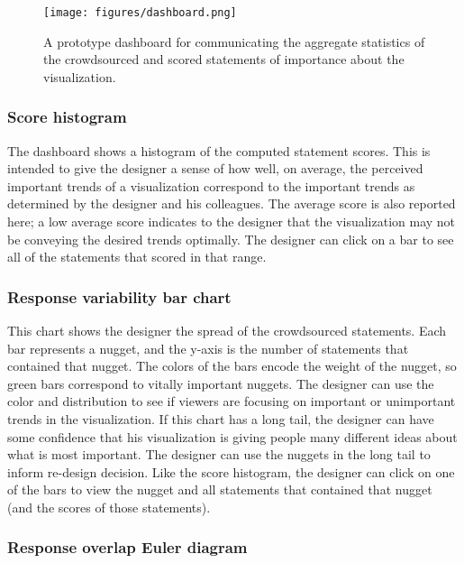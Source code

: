 \documentclass{sigchi}
\begin{document}
\begin{figure}[t]
  \begin{center}
    \texttt{[image: figures/dashboard.png]}
  \end{center}
  \caption{A prototype dashboard for communicating the aggregate statistics of the crowdsourced and scored statements of importance about the visualization.}
  \label{fig:dashboard}
\end{figure}

\subsubsection{Score histogram}

The dashboard shows a histogram of the computed statement scores. This
is intended to give the designer a sense of how well, on average, the
perceived important trends of a visualization correspond to the
important trends as determined by the designer and his colleagues. The
average score is also reported here; a low average score indicates to
the designer that the visualization may not be conveying the desired
trends optimally. The designer can click on a bar to see all of the
statements that scored in that range.

\subsubsection{Response variability bar chart}

This chart shows the designer the spread of the crowdsourced
statements. Each bar represents a nugget, and the y-axis is the number
of statements that contained that nugget. The colors of the bars
encode the weight of the nugget, so green bars correspond to vitally
important nuggets. The designer can use the color and distribution to
see if viewers are focusing on important or unimportant trends in the
visualization. If this chart has a long tail, the designer can have
some confidence that his visualization is giving people many different
ideas about what is most important. The designer can use the nuggets
in the long tail to inform re-design decision. Like the score
histogram, the designer can click on one of the bars to view the
nugget and all statements that contained that nugget (and the scores
of those statements).

\subsubsection{Response overlap Euler diagram}
\end{document}

